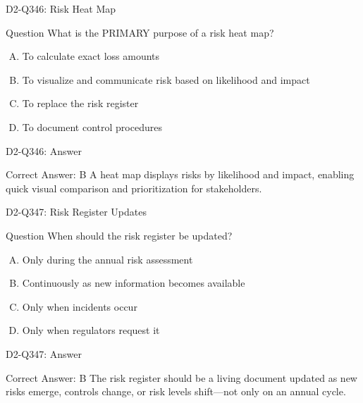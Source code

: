 \documentclass{beamer}
\begin{document}
\begin{frame}{D2-Q346: Risk Heat Map}
	\begin{block}{Question}
		What is the PRIMARY purpose of a risk heat map?
	\end{block}
	\begin{enumerate}[(A)]
		\item To calculate exact loss amounts
		\item To visualize and communicate risk based on likelihood and impact
		\item To replace the risk register
		\item To document control procedures
	\end{enumerate}
\end{frame}
\begin{frame}{D2-Q346: Answer}
	\begin{block}{Correct Answer: B}
		A heat map displays risks by likelihood and impact, enabling quick visual comparison and prioritization for stakeholders.
	\end{block}
\end{frame}

\begin{frame}{D2-Q347: Risk Register Updates}
	\begin{block}{Question}
		When should the risk register be updated?
	\end{block}
	\begin{enumerate}[(A)]
		\item Only during the annual risk assessment
		\item Continuously as new information becomes available
		\item Only when incidents occur
		\item Only when regulators request it
	\end{enumerate}
\end{frame}
\begin{frame}{D2-Q347: Answer}
	\begin{block}{Correct Answer: B}
		The risk register should be a living document updated as new risks emerge, controls change, or risk levels shift—not only on an annual cycle.
	\end{block}
\end{frame}
\end{document}
